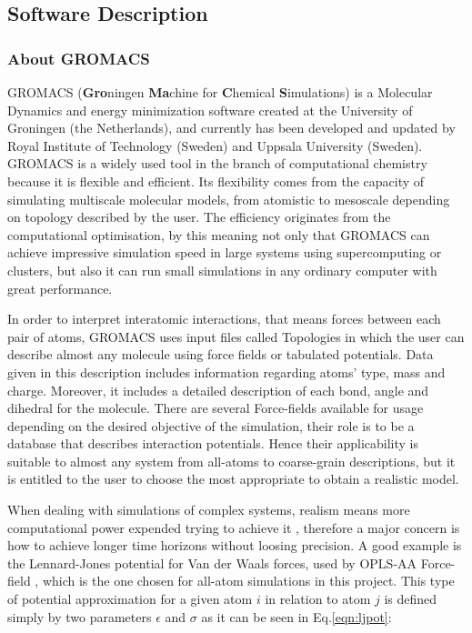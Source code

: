 \documentclass[10pt,a4paper,twoside]{article}
\begin{document}
\subsection{Software Description}
\subsubsection{About GROMACS}

 GROMACS (\textbf{Gro}ningen \textbf{Ma}chine for \textbf{C}hemical \textbf{S}imulations) \cite{gromanual} is a Molecular Dynamics and energy minimization software created at the University of Groningen (the Netherlands), and currently has been developed and updated by Royal Institute of Technology (Sweden) and Uppsala University (Sweden). GROMACS is a widely used tool in the branch of computational chemistry because it is flexible and efficient. Its flexibility comes from the capacity of simulating multiscale molecular models, from atomistic to mesoscale depending on topology described by the user. The efficiency originates from the computational optimisation, by this meaning not only that GROMACS can achieve impressive simulation speed in large systems using supercomputing or clusters, but also it can run small simulations in any ordinary computer with great performance.
 
 In order to interpret interatomic interactions, that means forces between each pair of atoms, GROMACS uses input files called Topologies in which the user can describe almost any molecule using force fields or tabulated potentials. Data given in this description includes information regarding atoms' type, mass and charge. Moreover, it includes a detailed description of each bond, angle and dihedral for the molecule. There are several Force-fields available for usage depending on the desired objective of the simulation, their role is to be a database that describes interaction potentials. Hence their applicability is suitable to almost any system from all-atoms to coarse-grain descriptions, but it is entitled to the user to choose the most appropriate to obtain a realistic model.
 
  When dealing with simulations of complex systems, realism means more computational power expended trying to achieve it \cite{satoh}, therefore a major concern is how to achieve longer time horizons without loosing precision. A good example is the Lennard-Jones potential for Van der Waals forces, used by OPLS-AA Force-field \cite{opls}, which is the one chosen for all-atom simulations in this project. This type of potential approximation for a given atom $i$ in relation to atom $j$ is defined simply by two parameters  $\epsilon$ and $\sigma$ as it can be seen in Eq.\ref{eqn:ljpot}:
\end{document}
